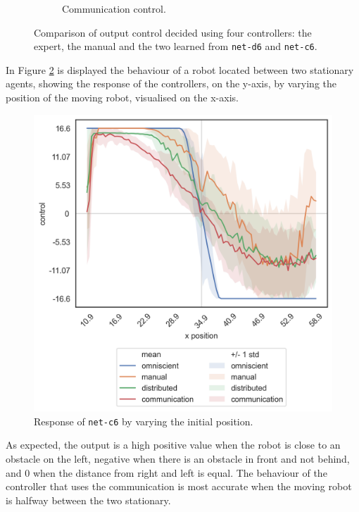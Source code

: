 \begin{figure}[!htb]
\begin{center}
\begin{subfigure}[h]{0.35\textwidth}
			\caption{Communication control.}
		\end{subfigure}
	\end{center}
	\caption[Evaluation of the control decided by \texttt{net-c6}.]{Comparison of 
	output control decided using four controllers: the expert, the manual and the 
	two learned from \texttt{net-d6} and 
	\texttt{net-c6}.}
	\label{fig:net-c6control}
\end{figure}

In Figure \ref{fig:net-c6responseposition} is displayed the behaviour of a robot 
located between two stationary agents, showing the response of the controllers, 
on the y-axis, by varying the position of the moving robot, visualised on the 
x-axis.  
\begin{figure}[!htb]
	\centering
	\includegraphics[width=.45\textwidth]{contents/images/net-c6/response-varying_init_position-communication}%
	\caption{Response of \texttt{net-c6} by varying the initial position.}
	\label{fig:net-c6responseposition}
\end{figure}
As expected, the output is a high positive value when the robot is close to an 
obstacle on the left, negative when there is an obstacle in front and not behind, 
and $0$ when the distance from right and left is equal.
The behaviour of the controller that uses the communication is most accurate 
when the moving robot is halfway between the two stationary.

